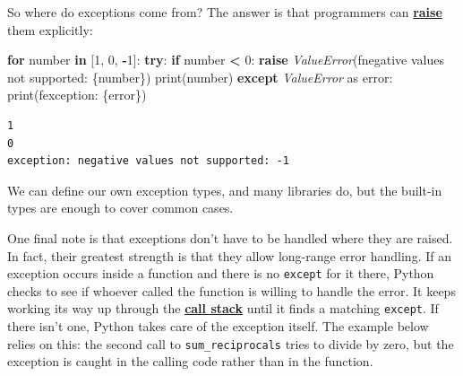 \documentclass[
]{krantz}
\makeatletter
\newenvironment{Shaded}{\begin{snugshade}}{\end{snugshade}}
\newcommand{\BuiltInTok}[1]{#1}
\newcommand{\ControlFlowTok}[1]{\textcolor[rgb]{0.13,0.29,0.53}{\textbf{#1}}}
\newcommand{\DecValTok}[1]{\textcolor[rgb]{0.00,0.00,0.81}{#1}}
\newcommand{\ImportTok}[1]{#1}
\newcommand{\KeywordTok}[1]{\textcolor[rgb]{0.13,0.29,0.53}{\textbf{#1}}}
\newcommand{\NormalTok}[1]{#1}
\newcommand{\OperatorTok}[1]{\textcolor[rgb]{0.81,0.36,0.00}{\textbf{#1}}}
\newcommand{\PreprocessorTok}[1]{\textcolor[rgb]{0.56,0.35,0.01}{\textit{#1}}}
\newcommand{\SpecialCharTok}[1]{\textcolor[rgb]{0.00,0.00,0.00}{#1}}
\newcommand{\SpecialStringTok}[1]{\textcolor[rgb]{0.31,0.60,0.02}{#1}}
\newenvironment{kframe}{%
\medskip{}
\setlength{\fboxsep}{.8em}
 \def\at@end@of@kframe{}%
 \ifinner\ifhmode%
  \def\at@end@of@kframe{\end{minipage}}%
  \begin{minipage}{\columnwidth}%
 \fi\fi%
 \def\FrameCommand##1{\hskip\@totalleftmargin \hskip-\fboxsep
 \colorbox{shadecolor}{##1}\hskip-\fboxsep
     \hskip-\linewidth \hskip-\@totalleftmargin \hskip\columnwidth}%
 \MakeFramed {\advance\hsize-\width
   \@totalleftmargin\z@ \linewidth\hsize
   \@setminipage}}%
 {\par\unskip\endMakeFramed%
 \at@end@of@kframe}
\renewenvironment{Shaded}{\begin{kframe}}{\end{kframe}}
\newcommand{\gref}[2]{\hyperlink{#2}{\textbf{#1}}}
\makeatother
\begin{document}
So where do exceptions come from?
The answer is that programmers can \gref{raise}{raise\_exception} them explicitly:

\begin{Shaded}
\begin{Highlighting}[]
\ControlFlowTok{for}\NormalTok{ number }\KeywordTok{in}\NormalTok{ [}\DecValTok{1}\NormalTok{, }\DecValTok{0}\NormalTok{, }\OperatorTok{{-}}\DecValTok{1}\NormalTok{]:}
    \ControlFlowTok{try}\NormalTok{:}
        \ControlFlowTok{if}\NormalTok{ number }\OperatorTok{\textless{}} \DecValTok{0}\NormalTok{:}
            \ControlFlowTok{raise} \PreprocessorTok{ValueError}\NormalTok{(}\SpecialStringTok{f\textquotesingle{}negative values not supported: }\SpecialCharTok{\{}\NormalTok{number}\SpecialCharTok{\}}\SpecialStringTok{\textquotesingle{}}\NormalTok{)}
        \BuiltInTok{print}\NormalTok{(number)}
    \ControlFlowTok{except} \PreprocessorTok{ValueError} \ImportTok{as}\NormalTok{ error:}
        \BuiltInTok{print}\NormalTok{(}\SpecialStringTok{f\textquotesingle{}exception: }\SpecialCharTok{\{}\NormalTok{error}\SpecialCharTok{\}}\SpecialStringTok{\textquotesingle{}}\NormalTok{)}
\end{Highlighting}
\end{Shaded}

\begin{verbatim}
1
0
exception: negative values not supported: -1
\end{verbatim}

We can define our own exception types,
and many libraries do,
but the built-in types are enough to cover common cases.

One final note is that exceptions don't have to be handled where they are raised.
In fact,
their greatest strength is that they allow long-range error handling.
If an exception occurs inside a function and there is no \texttt{except} for it there,
Python checks to see if whoever called the function is willing to handle the error.
It keeps working its way up through the \gref{call stack}{call\_stack}
until it finds a matching \texttt{except}.
If there isn't one,
Python takes care of the exception itself.
The example below relies on this:
the second call to \texttt{sum\_reciprocals} tries to divide by zero,
but the exception is caught in the calling code
rather than in the function.
\end{document}
